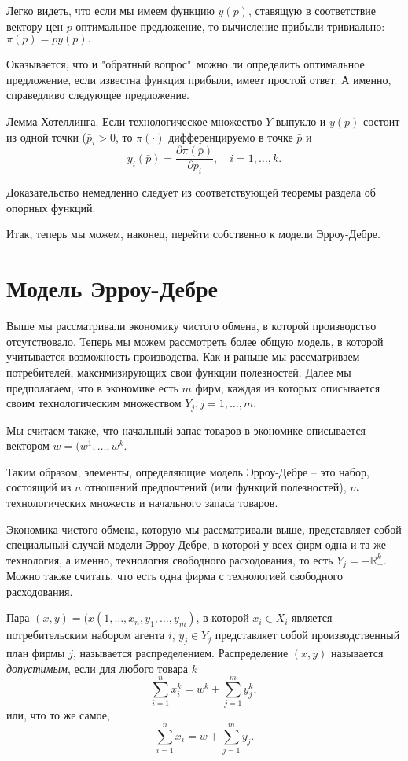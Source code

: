 Легко видеть, что если мы имеем функцию $y(p)$, ставящую в
соответствие вектору цен $p$ оптимальное предложение, то вычисление прибыли
тривиально: $\pi (p)=py(p).$

Оказывается, что и "обратный вопрос"\, можно ли определить оптимальное предложение,
если известна функция прибыли, имеет простой ответ. А именно, справедливо следующее предложение.


\underline{Лемма Хотеллинга}. Если технологическое множество $Y$ выпукло
и $y(\bar{p})$ состоит из одной точки ($\bar{p}_i>0$, то $\pi (\cdot)$
дифференцируемо в точке $\bar{p}$ и
$$
y_i(\bar p)={\frac{\partial\pi(\bar p)}{\partial p_i}},\quad
i=1,\ldots,k.
$$

Доказательство немедленно следует из соответствующей теоремы раздела об опорных функций.

Итак, теперь мы можем, наконец, перейти собственно к модели Эрроу-Дебре.



\section*{Модель Эрроу-Дебре}


Выше мы рассматривали экономику чистого обмена, в которой производство отсутствовало.
Теперь мы можем рассмотреть более общую модель, в которой учитывается возможность
производства. Как и раньше мы рассматриваем потребителей, максимизирующих свои функции
полезностей. Далее мы предполагаем, что в экономике есть $m$ фирм, каждая из которых описывается
своим технологическим множеством $Y_j, j=1,\ldots,m$.

Мы считаем также, что начальный запас товаров в экономике описывается вектором
$w=(w^1,\ldots,w^k$.

Таким образом, элементы, определяющие модель Эрроу-Дебре -- это
набор, состоящий из $n$ отношений предпочтений (или функций полезностей),
$m$ технологических множеств и начального запаса товаров.

Экономика чистого обмена, которую мы рассматривали выше, представляет собой
специальный случай модели Эрроу-Дебре, в которой у всех фирм одна и та же
технология, а именно, технология свободного расходования, то есть $Y_j=-\mathbb{R}
^k_+$. Можно также считать, что есть одна фирма с технологией
свободного расходования.

Пара $(x,y)=(x(1,\ldots,x_n,y_1,\ldots,y_m)$, в которой
$x_i\in X_i$ является потребительским набором агента $i$, $y_j\in Y_j$ представляет собой
производственный план фирмы $j$, называется распределением.
Распределение $(x,y)$ называется \emph{допустимым}, если для любого  товара $k$
$$
\sum^n_{i=1}x^k_i=w^k+\sum^m_{j=1}y^k_j,
$$
или, что то же самое,
$$
\sum^n_{i=1}x_i=w+\sum^m_{j=1}y_j.
$$

